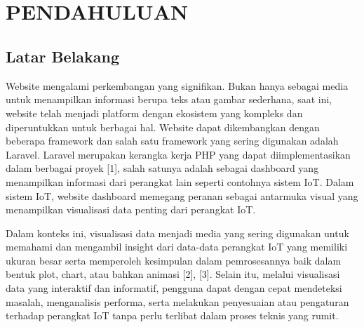 \chapter[PENDAHULUAN]{\\ PENDAHULUAN}

\section{Latar Belakang}
Website mengalami perkembangan yang signifikan. Bukan hanya sebagai media untuk menampilkan informasi berupa teks atau gambar sederhana, saat ini, website telah menjadi platform dengan ekosistem yang kompleks dan diperuntukkan untuk berbagai hal. Website dapat dikembangkan dengan beberapa framework dan salah satu framework yang sering digunakan adalah Laravel. Laravel merupakan kerangka kerja PHP yang dapat diimplementasikan dalam berbagai proyek [1], salah satunya adalah sebagai dashboard yang menampilkan informasi dari perangkat lain seperti contohnya sistem IoT. Dalam sistem IoT, website dashboard memegang peranan sebagai antarmuka visual yang menampilkan visualisasi data penting dari perangkat IoT.

Dalam konteks ini, visualisasi data menjadi media yang sering digunakan untuk memahami dan mengambil insight dari data-data perangkat IoT yang memiliki ukuran besar serta memperoleh kesimpulan dalam pemrosesannya baik dalam bentuk plot, chart, atau bahkan animasi [2], [3]. Selain itu, melalui visualisasi data yang interaktif dan informatif, pengguna dapat dengan cepat mendeteksi masalah, menganalisis performa, serta melakukan penyesuaian atau pengaturan terhadap perangkat IoT tanpa perlu terlibat dalam proses teknis yang rumit. 

